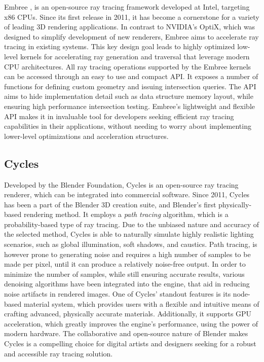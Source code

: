 Embree \supercite{Wald2014}, is an open-source ray tracing framework developed at Intel, targeting x86 CPUs. 
Since its first release in 2011, it has become a cornerstone for a variety of leading 3D rendering applications. 
In contrast to NVIDIA's OptiX, which was designed to simplify development of new renderers, Embree aims to accelerate ray tracing in existing systems. 
This key design goal leads to highly optimized low-level kernels for accelerating ray generation and traversal that leverage modern CPU architectures.
All ray tracing operations supported by the Embree kernels can be accessed through an easy to use and compact API.
It exposes a number of functions for defining custom geometry and issuing intersection queries. 
The API aims to hide implementation detail such as data structure memory layout, while ensuring high performance intersection testing. 
Embree's lightweight and flexible API makes it in invaluable tool for developers seeking efficient ray tracing capabilities in their applications, without needing to worry about implementing lower-level optimizations and acceleration structures.

\subsection{Cycles}

Developed by the Blender Foundation, Cycles \supercite{Cycles} is an open-source ray tracing renderer, which can be integrated into commercial software. 
Since 2011, Cycles has been a part of the Blender 3D creation suite, and Blender's first physically-based rendering method.
It employs a \textit{path tracing} algorithm, which is a probability-based type of ray tracing.
Due to the unbiased nature and accuracy of the selected method, Cycles is able to naturally simulate highly realistic lighting scenarios, such as global illumination, soft shadows, and caustics.
Path tracing, is however prone to generating noise and requires a high number of samples to be made per pixel, until it can produce a relatively noise-free output.
In order to minimize the number of samples, while still ensuring accurate results, various denoising algorithms have been integrated into the engine, that aid in reducing noise artifacts in rendered images.
One of Cycles' standout features is its node-based material system, which provides users with a flexible and intuitive means of crafting advanced, physically accurate materials. 
Additionally, it supports GPU acceleration, which greatly improves the engine's performance, using the power of modern hardware.
The collaborative and open-source nature of Blender makes Cycles is a compelling choice for digital artists and designers seeking for a robust and accessible ray tracing solution.


